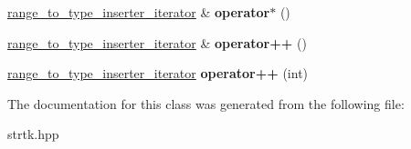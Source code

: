 \begin{DoxyCompactItemize}
\item 
\hypertarget{classstrtk_1_1range__to__type__inserter__iterator_affcee0aab400652427aeda5dbccb7924}{\hyperlink{classstrtk_1_1range__to__type__inserter__iterator}{range\-\_\-to\-\_\-type\-\_\-inserter\-\_\-iterator} \& {\bfseries operator$\ast$} ()}\label{classstrtk_1_1range__to__type__inserter__iterator_affcee0aab400652427aeda5dbccb7924}

\item 
\hypertarget{classstrtk_1_1range__to__type__inserter__iterator_a12dce4fc6cd8fbd47ba0aa4613d71a7b}{\hyperlink{classstrtk_1_1range__to__type__inserter__iterator}{range\-\_\-to\-\_\-type\-\_\-inserter\-\_\-iterator} \& {\bfseries operator++} ()}\label{classstrtk_1_1range__to__type__inserter__iterator_a12dce4fc6cd8fbd47ba0aa4613d71a7b}

\item 
\hypertarget{classstrtk_1_1range__to__type__inserter__iterator_aa377239a29af218a8afdd2e928d83310}{\hyperlink{classstrtk_1_1range__to__type__inserter__iterator}{range\-\_\-to\-\_\-type\-\_\-inserter\-\_\-iterator} {\bfseries operator++} (int)}\label{classstrtk_1_1range__to__type__inserter__iterator_aa377239a29af218a8afdd2e928d83310}

\end{DoxyCompactItemize}


The documentation for this class was generated from the following file\-:\begin{DoxyCompactItemize}
\item 
strtk.\-hpp\end{DoxyCompactItemize}
